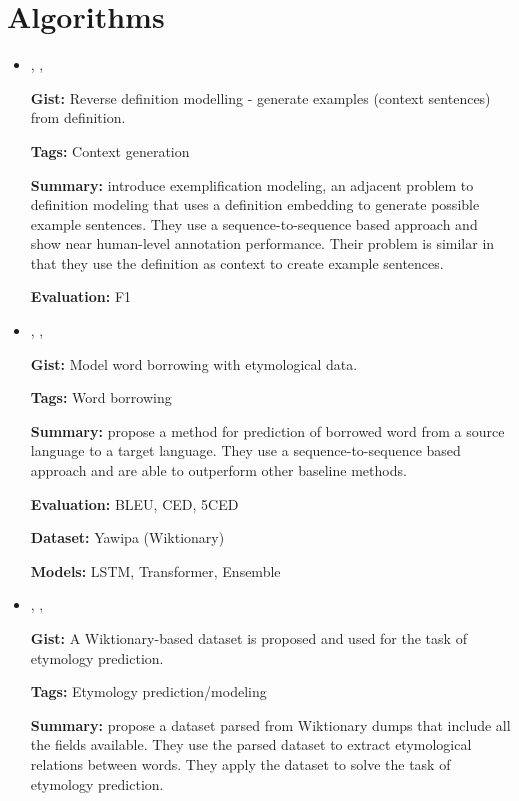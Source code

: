 \documentclass{article}[a4paper]
\newcommand{\bitem}[2]{
    \item[\cite{#1}]
        \citetitle{#1}, \citeauthor{#1}, \citeyear{#1}
        \newline
        {#2}
}%
\begin{document}
\section{Algorithms}
\begin{itemize}
    \bitem{barba_exemplification_2021}%
    {%
        \textbf{Gist:}
        Reverse definition modelling - generate examples (context sentences)
        from definition.

        \textbf{Tags:}
        Context generation

        \textbf{Summary:}
        \citeauthor{barba_exemplification_2021} introduce exemplification
        modeling, an adjacent problem to definition modeling that uses a
        definition embedding to generate possible example sentences. They use a
        sequence-to-sequence based approach and show near human-level annotation
        performance. Their problem is similar in that they use the definition as
        context to create example sentences.

        \textbf{Evaluation:}
        F1
    }%

    \bitem{wu_2021_sequence}%
    {%
        \textbf{Gist:}
        Model word borrowing with etymological data.

        \textbf{Tags:}
        Word borrowing

        \textbf{Summary:}
        \citeauthor{wu_2021_sequence} propose a method for prediction of
        borrowed word from a source language to a target language. They use a
        sequence-to-sequence based approach and are able to outperform other
        baseline methods.

        \textbf{Evaluation:}
        BLEU, CED, 5CED

        \textbf{Dataset:}
        Yawipa (Wiktionary)

        \textbf{Models:}
        LSTM, Transformer, Ensemble
    }%

    \bitem{wu_computational_2020}%
    {%
        \textbf{Gist:}
        A Wiktionary-based dataset is proposed and used for the task of
        etymology prediction.

        \textbf{Tags:}
        Etymology prediction/modeling

        \textbf{Summary:}
        \citeauthor{wu_computational_2020} propose a dataset parsed from
        Wiktionary dumps that include all the fields available. They use the
        parsed dataset to extract etymological relations between words. They
        apply the dataset to solve the task of etymology prediction.

}
\end{itemize}
\end{document}
